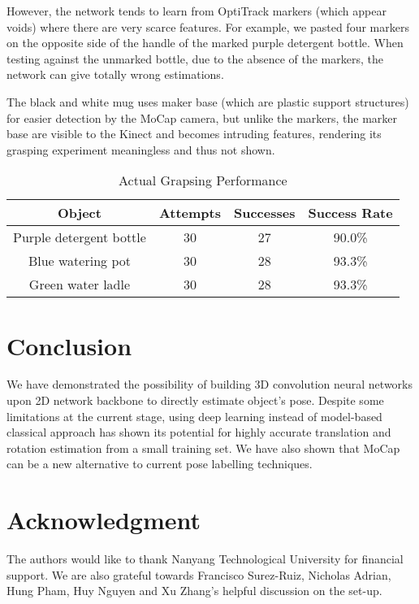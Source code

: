 \documentclass[conference]{IEEEtran}
\begin{document}
However, the network tends to learn from OptiTrack markers (which appear voids) where there are very scarce features. For example, we pasted four markers on the opposite side of the handle of the marked purple detergent bottle. When testing against the unmarked bottle, due to the absence of the markers, the network can give totally wrong estimations.

The black and white mug uses maker base (which are plastic support structures) for easier detection by the MoCap camera, but unlike the markers, the marker base are visible to the Kinect and becomes intruding features, rendering its grasping experiment meaningless and thus not shown.

\begin{table}[htbp]
\caption{Actual Grapsing Performance}
\begin{center}
\begin{tabular}{|c|c|c|c|}
\hline
\textbf{Object}&\textbf{Attempts}&\textbf{Successes}&\textbf{Success Rate} \\
\hline
Purple detergent bottle&30&27&90.0\% \\
\hline
Blue watering pot&30&28&93.3\% \\
\hline
Green water ladle&30&28&93.3\% \\
\hline
\end{tabular}
\label{tab_actual_grasping_perf}
\end{center}
\end{table}


\section{Conclusion}
We have demonstrated the possibility of building 3D convolution neural networks upon 2D network backbone to directly estimate object's pose. Despite some limitations at the current stage, using deep learning instead of model-based classical approach has shown its potential for highly accurate translation and rotation estimation from a small training set. We have also shown that MoCap can be a new alternative to current pose labelling techniques.


\section{Acknowledgment}
The authors would like to thank Nanyang Technological University for financial support. We are also grateful towards Francisco Surez-Ruiz, Nicholas Adrian, Hung Pham, Huy Nguyen and Xu Zhang's helpful discussion on the set-up.




\end{document}
